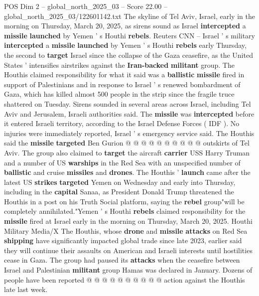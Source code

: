 \begin{textsample}{POS Dim 2 – global\_north\_2025\_03 – Score 22.00 – global\_north\_2025\_03/122601142.txt}  \label{ex:f2_pos_412}
The skyline of Tel Aviv, Israel, early in the morning on Thursday, March 20, 2025, as sirens sound as Israel \textbf{intercepted} a \textbf{missile} \textbf{launched} by Yemen ' s Houthi \textbf{rebels}.
Reuters CNN -- Israel ' s military \textbf{intercepted} a \textbf{missile} \textbf{launched} by Yemen ' s Houthi \textbf{rebels} early Thursday, the second to \textbf{target} Israel since the collapse of the Gaza ceasefire, as the United States ' intensifies airstrikes against the \textbf{Iran-backed} \textbf{militant} group.
The Houthis claimed responsibility for what it said was a \textbf{ballistic} \textbf{missile} fired in support of Palestinians and in response to Israel ' s renewed bombardment of Gaza, which has killed almost 500 people in the strip since the fragile truce shattered on Tuesday.
Sirens sounded in several areas across Israel, including Tel Aviv and Jerusalem, Israeli authorities said.
The \textbf{missile} was \textbf{intercepted} before it entered Israeli territory, according to the Israel Defense Forces ( IDF ).
No injuries were immediately reported, Israel ' s emergency service said.
The Houthis said the \textbf{missile} \textbf{targeted} Ben Gurion @ @ @ @ @ @ @ @ @ @ outskirts of Tel Aviv.
The group also claimed to \textbf{target} the aircraft \textbf{carrier} USS Harry Truman and a number of US \textbf{warships} in the Red Sea with an unspecified number of \textbf{ballistic} and cruise \textbf{missiles} and \textbf{drones}.
The Houthis ' \textbf{launch} came after the latest US \textbf{strikes} \textbf{targeted} Yemen on Wednesday and early into Thursday, including in the \textbf{capital} Sanaa, as President Donald Trump threatened the Houthis in a post on his Truth Social platform, saying the \textbf{rebel} group"will be completely annihilated."Yemen ' s Houthi \textbf{rebels} claimed responsibility for the \textbf{missile} fired at Israel early in the morning on Thursday, March 20, 2025.
Houthi Military Media/X The Houthis, whose \textbf{drone} and \textbf{missile} \textbf{attacks} on Red Sea \textbf{shipping} have significantly impacted global trade since late 2023, earlier said they will continue their assaults on American and Israeli interests until hostilities cease in Gaza.
The group had paused its \textbf{attacks} when the ceasefire between Israel and Palestinian \textbf{militant} group Hamas was declared in January.
Dozens of people have been reported @ @ @ @ @ @ @ @ @ @ action against the Houthis late last week.

\end{textsample}
